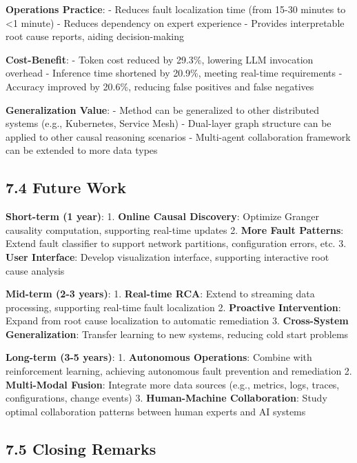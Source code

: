\textbf{Operations Practice}: - Reduces fault localization time (from
15-30 minutes to \textless1 minute) - Reduces dependency on expert
experience - Provides interpretable root cause reports, aiding
decision-making

\textbf{Cost-Benefit}: - Token cost reduced by 29.3\%, lowering LLM
invocation overhead - Inference time shortened by 20.9\%, meeting
real-time requirements - Accuracy improved by 20.6\%, reducing false
positives and false negatives

\textbf{Generalization Value}: - Method can be generalized to other
distributed systems (e.g., Kubernetes, Service Mesh) - Dual-layer graph
structure can be applied to other causal reasoning scenarios -
Multi-agent collaboration framework can be extended to more data types

\hypertarget{future-work}{%
\subsection{7.4 Future Work}\label{future-work}}

\textbf{Short-term (1 year)}: 1. \textbf{Online Causal Discovery}:
Optimize Granger causality computation, supporting real-time updates 2.
\textbf{More Fault Patterns}: Extend fault classifier to support network
partitions, configuration errors, etc. 3. \textbf{User Interface}:
Develop visualization interface, supporting interactive root cause
analysis

\textbf{Mid-term (2-3 years)}: 1. \textbf{Real-time RCA}: Extend to
streaming data processing, supporting real-time fault localization 2.
\textbf{Proactive Intervention}: Expand from root cause localization to
automatic remediation 3. \textbf{Cross-System Generalization}: Transfer
learning to new systems, reducing cold start problems

\textbf{Long-term (3-5 years)}: 1. \textbf{Autonomous Operations}:
Combine with reinforcement learning, achieving autonomous fault
prevention and remediation 2. \textbf{Multi-Modal Fusion}: Integrate
more data sources (e.g., metrics, logs, traces, configurations, change
events) 3. \textbf{Human-Machine Collaboration}: Study optimal
collaboration patterns between human experts and AI systems

\hypertarget{closing-remarks}{%
\subsection{7.5 Closing Remarks}\label{closing-remarks}}

